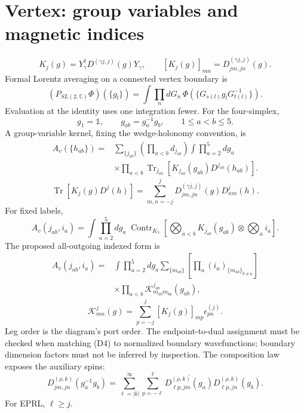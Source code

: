 \documentclass[11pt,a4paper]{article}
\newcommand{\Contr}{\operatorname{Contr}}
\newcommand{\Tr}{\operatorname{Tr}}
\newcommand{\eq}[2]{\begin{equation}#2\tag{#1}\end{equation}}
\begin{document}
\section{Vertex: group variables and magnetic indices}
\eq{D1}{K_j(g)=Y_\gamma^\dagger D^{(\gamma j,j)}(g)Y_\gamma,\qquad[K_j(g)]_{mn}=D^{(\gamma j,j)}_{jm,jn}(g).}
Formal Lorentz averaging on a connected vertex boundary is
\eq{D2}{(P_{SL(2,\mathbb C)}\Phi)(\{g_l\})=\int\prod_n dG_n\,\Phi(\{G_{s(l)}g_lG_{t(l)}^{-1}\}).}
Evaluation at the identity uses one integration fewer. For the four-simplex,
\eq{D3}{g_1=\mathbb1,\qquad g_{ab}=g_a^{-1}g_b,\qquad1\le a<b\le5.}
A group-variable kernel, fixing the wedge-holonomy convention, is
\eq{D4}{\begin{aligned}
A_v(\{h_{ab}\})={}&\sum_{\{j_{ab}\}}\left(\prod_{a<b}d_{j_{ab}}\right)\int\prod_{a=2}^5dg_a\\
&\times\prod_{a<b}\Tr_{j_{ab}}\left[K_{j_{ab}}(g_{ab})D^{j_{ab}}(h_{ab})\right].
\end{aligned}}
\eq{D5}{\Tr[K_j(g)D^j(h)]=\sum_{m,n=-j}^j D^{(\gamma j,j)}_{jm,jn}(g)D^j_{nm}(h).}
For fixed labels,
\eq{D6}{A_v(j_{ab},i_a)=\int\prod_{a=2}^5dg_a\;\Contr_{K_5}\left[\bigotimes_{a<b}K_{j_{ab}}(g_{ab})\otimes\bigotimes_ai_a\right].}
The proposed all-outgoing indexed form is
\eq{D7}{\begin{aligned}
A_v(j_{ab},i_a)={}&\int\prod_{a=2}^5dg_a\sum_{\{m_{ab}\}}\left[\prod_a(i_a)_{\{m_{ab}\}_{b\ne a}}\right]\\
&\times\prod_{a<b}\mathcal K^{j_{ab}}_{m_{ab}m_{ba}}(g_{ab}),
\end{aligned}}
\eq{D8}{\mathcal K^j_{mn}(g)=\sum_{p=-j}^j[K_j(g)]_{mp}\epsilon^{(j)}_{pn}.}
Leg order is the diagram's port order. The endpoint-to-dual assignment must be checked when matching (D4) to normalized boundary wavefunctions; boundary dimension factors must not be inferred by inspection.
The composition law exposes the auxiliary spins:
\eq{D9}{D^{(\rho,k)}_{jm,jn}(g_a^{-1}g_b)=\sum_{\ell=|k|}^\infty\sum_{p=-\ell}^{\ell}\overline{D^{(\rho,k)}_{\ell p,jm}(g_a)}D^{(\rho,k)}_{\ell p,jn}(g_b).}
For EPRL, $\ell\ge j$.
\end{document}
